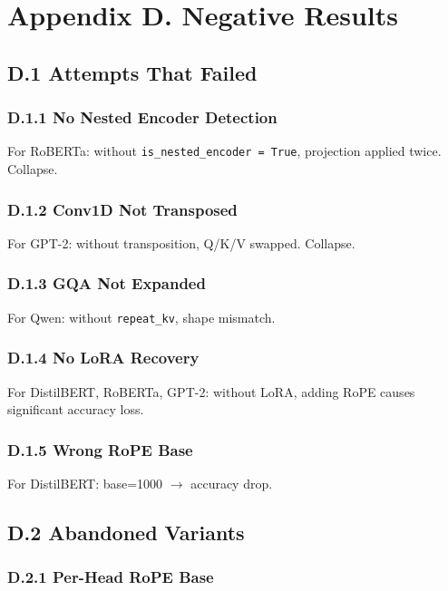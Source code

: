 
\section{Appendix D. Negative Results}

\subsection{D.1 Attempts That Failed}

\subsubsection{D.1.1 No Nested Encoder Detection}

For RoBERTa: without \texttt{is\_nested\_encoder = True}, projection applied twice. 
Collapse.

\subsubsection{D.1.2 Conv1D Not Transposed}

For GPT-2: without transposition, Q/K/V swapped. Collapse.

\subsubsection{D.1.3 GQA Not Expanded}

For Qwen: without \texttt{repeat\_kv}, shape mismatch.

\subsubsection{D.1.4 No LoRA Recovery}

For DistilBERT, RoBERTa, GPT-2: without LoRA, adding RoPE causes 
significant accuracy loss.

\subsubsection{D.1.5 Wrong RoPE Base}

For DistilBERT: base=1000 $\to$ accuracy drop.

\subsection{D.2 Abandoned Variants}

\subsubsection{D.2.1 Per-Head RoPE Base}

